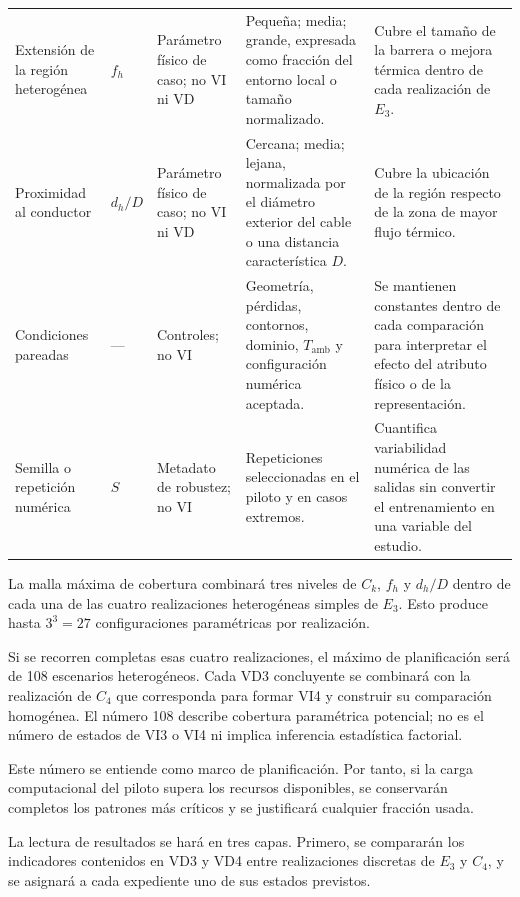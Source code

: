 \documentclass[11pt,a4paper,oneside]{report}
\newcommand{\tesisbodyfont}{\fontsize{11}{13.6}\selectfont}
\begin{document}
\begin{singlespace}
\begin{landscape}
\begin{longtable}{L{3.10cm}L{1.45cm}L{3.00cm}L{5.15cm}L{5.25cm}}
Extensión de la región heterogénea & $f_h$ & Parámetro físico de caso; no VI ni VD & Pequeña; media; grande, expresada como fracción del entorno local o tamaño normalizado. & Cubre el tamaño de la barrera o mejora térmica dentro de cada realización de $E_3$. \\

Proximidad al conductor & $d_h/D$ & Parámetro físico de caso; no VI ni VD & Cercana; media; lejana, normalizada por el diámetro exterior del cable o una distancia característica $D$. & Cubre la ubicación de la región respecto de la zona de mayor flujo térmico. \\

Condiciones pareadas & --- & Controles; no VI & Geometría, pérdidas, contornos, dominio, $T_{\mathrm{amb}}$ y configuración numérica aceptada. & Se mantienen constantes dentro de cada comparación para interpretar el efecto del atributo físico o de la representación. \\

Semilla o repetición numérica & $S$ & Metadato de robustez; no VI & Repeticiones seleccionadas en el piloto y en casos extremos. & Cuantifica variabilidad numérica de las salidas sin convertir el entrenamiento en una variable del estudio. \\

\end{longtable}

\tesisbodyfont

La malla máxima de cobertura combinará tres niveles de $C_k$, $f_h$ y $d_h/D$ dentro de cada una de las cuatro realizaciones heterogéneas simples de $E_3$. Esto produce hasta $3^3=27$ configuraciones paramétricas por realización.

Si se recorren completas esas cuatro realizaciones, el máximo de planificación será de 108 escenarios heterogéneos. Cada VD3 concluyente se combinará con la realización de $C_4$ que corresponda para formar VI4 y construir su comparación homogénea. El número 108 describe cobertura paramétrica potencial; no es el número de estados de VI3 o VI4 ni implica inferencia estadística factorial.

Este número se entiende como marco de planificación. Por tanto, si la carga computacional del piloto supera los recursos disponibles, se conservarán completos los patrones más críticos y se justificará cualquier fracción usada.

La lectura de resultados se hará en tres capas. Primero, se compararán los indicadores contenidos en VD3 y VD4 entre realizaciones discretas de $E_3$ y $C_4$, y se asignará a cada expediente uno de sus estados previstos.


\end{landscape}
\end{singlespace}
\end{document}
